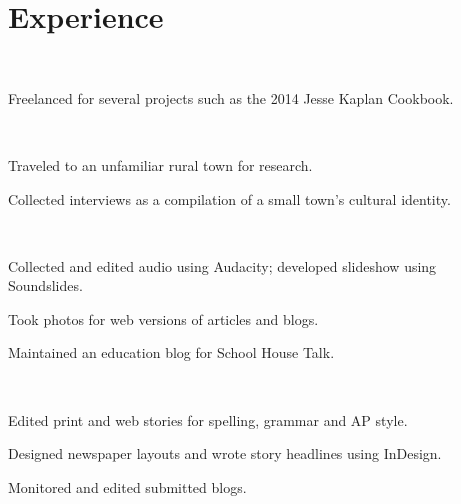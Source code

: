 \documentclass[]{hieudo-build}
\begin{document}
    
\begin{minipage}[t]{1.0\textwidth} 

\section{Experience}


 \\

\begin{tightemize} 
\item Freelanced for several projects such as the 2014 Jesse Kaplan Cookbook.
\end{tightemize}
\sectionsep

 \\
\begin{tightemize}
\item Traveled to an unfamiliar rural town for research.
\item Collected interviews as a compilation of a small town’s cultural identity.
\end{tightemize}
\sectionsep

 \\
\begin{tightemize} 
\item Collected and edited audio using Audacity; developed slideshow using Soundslides.
\item Took photos for web versions of articles and blogs.
\item Maintained an education blog for School House Talk.
\end{tightemize}
\sectionsep

 \\
\begin{tightemize} 
\item Edited print and web stories for spelling, grammar and AP style.
\item Designed newspaper layouts and wrote story headlines using InDesign.
\item Monitored and edited submitted blogs.
\end{tightemize}
\sectionsep


\end{minipage}
\end{document}
